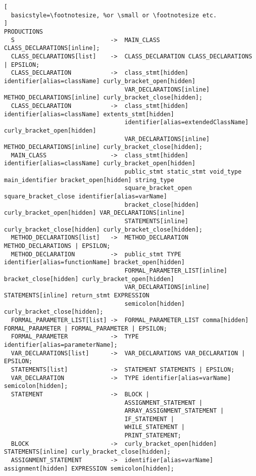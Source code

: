 \begin{lstlisting}[
  basicstyle=\footnotesize, %or \small or \footnotesize etc.
]
PRODUCTIONS
  S                           ->  MAIN_CLASS CLASS_DECLARATIONS[inline];
  CLASS_DECLARATIONS[list]    ->  CLASS_DECLARATION CLASS_DECLARATIONS | EPSILON;
  CLASS_DECLARATION           ->  class_stmt[hidden] identifier[alias=className] curly_bracket_open[hidden] 
                                  VAR_DECLARATIONS[inline] METHOD_DECLARATIONS[inline] curly_bracket_close[hidden];
  CLASS_DECLARATION           ->  class_stmt[hidden] identifier[alias=className] extents_stmt[hidden] 
                                  identifier[alias=extendedClassName] curly_bracket_open[hidden] 
                                  VAR_DECLARATIONS[inline] METHOD_DECLARATIONS[inline] curly_bracket_close[hidden];
  MAIN_CLASS                  ->  class_stmt[hidden] identifier[alias=className] curly_bracket_open[hidden] 
                                  public_stmt static_stmt void_type main_identifier bracket_open[hidden] string_type 
                                  square_bracket_open square_bracket_close identifier[alias=varName] 
                                  bracket_close[hidden] curly_bracket_open[hidden] VAR_DECLARATIONS[inline] 
                                  STATEMENTS[inline] curly_bracket_close[hidden] curly_bracket_close[hidden];
  METHOD_DECLARATIONS[list]   ->  METHOD_DECLARATION METHOD_DECLARATIONS | EPSILON;
  METHOD_DECLARATION          ->  public_stmt TYPE identifier[alias=functionName] bracket_open[hidden] 
                                  FORMAL_PARAMETER_LIST[inline] bracket_close[hidden] curly_bracket_open[hidden] 
                                  VAR_DECLARATIONS[inline] STATEMENTS[inline] return_stmt EXPRESSION 
                                  semicolon[hidden] curly_bracket_close[hidden];
  FORMAL_PARAMETER_LIST[list] ->  FORMAL_PARAMETER_LIST comma[hidden] FORMAL_PARAMETER | FORMAL_PARAMETER | EPSILON;
  FORMAL_PARAMETER            ->  TYPE identifier[alias=parameterName];
  VAR_DECLARATIONS[list]      ->  VAR_DECLARATIONS VAR_DECLARATION | EPSILON;
  STATEMENTS[list]            ->  STATEMENT STATEMENTS | EPSILON;
  VAR_DECLARATION             ->  TYPE identifier[alias=varName] semicolon[hidden];
  STATEMENT                   ->  BLOCK | 
                                  ASSIGNMENT_STATEMENT | 
                                  ARRAY_ASSIGNMENT_STATEMENT | 
                                  IF_STATEMENT | 
                                  WHILE_STATEMENT | 
                                  PRINT_STATEMENT;
  BLOCK                       ->  curly_bracket_open[hidden] STATEMENTS[inline] curly_bracket_close[hidden];
  ASSIGNMENT_STATEMENT        ->  identifier[alias=varName] assignment[hidden] EXPRESSION semicolon[hidden];

\end{lstlisting}
